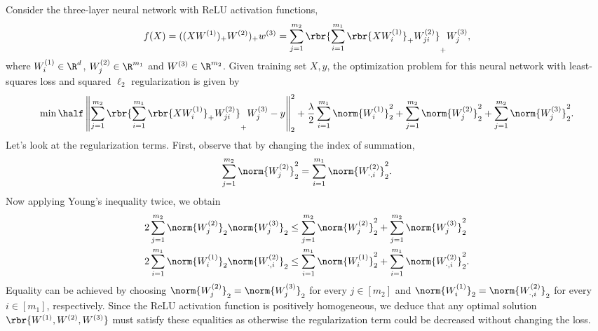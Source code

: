 \documentclass{article}
\newcommand{\wone}{W^{(1)}}
\newcommand{\wtwo}{W^{(2)}}
\newcommand{\wthree}{W^{(3)}}
\begin{document}
Consider the three-layer neural network with ReLU activation functions,
\begin{equation}
    \label{eq:three-layer-mlp}
    f(X)
    = ((X W^{(1)})_+ W^{(2)})_+ w^{(3)}
    = \sum_{j = 1}^{m_2} \rbr{\sum_{i = 1}^{m_1} \rbr{X \wone_i}_+ \wtwo_{ji}}_+ \wthree_j,
\end{equation}
where \( \wone_i \in \R^{d} \), \( \wtwo_j \in \R^{m_1} \) and \( \wthree \in \R^{m_2} \).
Given training set \( X, y \), the optimization problem for this neural network
with least-squares loss and squared \( \ell_2 \) regularization is given by
\begin{equation}
    \label{eq:three-layer-problem}
    \min
    \half \left\|
    \sum_{j = 1}^{m_2} \rbr{\sum_{i = 1}^{m_1} \rbr{X \wone_i}_+ \wtwo_{ji}}_+ \wthree_j
    - y
    \right\|_2^2
    + \frac{\lambda}{2}
    \sum_{i=1}^{m_1} \norm{\wone_i}_2^2
    + \sum_{j=1}^{m_2} \norm{\wtwo_j}_2^2
    + \sum_{j=1}^{m_2} \norm{\wthree_j}_2^2.
\end{equation}
Let's look at the regularization terms.
First, observe that by changing the index of summation, \[ \sum_{j=1}^{m_2}
    \norm{\wtwo_j}_2^2 = \sum_{i=1}^{m_1} \norm{\wtwo_{\cdot, i}}_2^2.
\]
Now applying Young's inequality twice, we obtain
\begin{align*}
    2 \sum_{j = 1}^{m_2} \norm{\wtwo_j}_2 \norm{\wthree_j}_2
     & \leq \sum_{j=1}^{m_2} \norm{\wtwo_j}_2^2
    + \sum_{j=1}^{m_2} \norm{\wthree_j}_2^2     \\
    2 \sum_{i = 1}^{m_1} \norm{\wone_i}_2 \norm{\wtwo_{\cdot, i}}_2
     & \leq \sum_{i=1}^{m_1} \norm{\wone_i}_2^2
    + \sum_{i=1}^{m_1} \norm{\wtwo_{\cdot, i}}_2^2.
\end{align*}
Equality can be achieved by choosing \( \norm{\wtwo_j}_2 = \norm{\wthree_j}_2
\) for every \( j \in [m_2] \) and \( \norm{\wone_i}_2 = \norm{\wtwo_{\cdot,
        i}}_2 \) for every \( i \in [m_1] \), respectively.
Since the ReLU activation function is positively homogeneous, we deduce that
any optimal solution \( \rbr{\wone, \wtwo, \wthree} \) must satisfy these
equalities as otherwise the regularization term could be decreased without
changing the loss.
\end{document}
